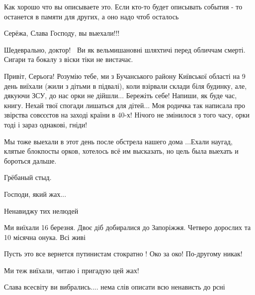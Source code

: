 
Как хорошо что вы описываете это. Если кто-то будет описывать события - то
останется в памяти для других, а оно надо чтоб осталось


Серёжа, Слава Господу, вы выехали!!!


Шедеврально, доктор!🤩🤗 Ви як вельмишановні шляхтичі перед обличчам смерті.
Сигари та бокалу з віски тіки не вистачає.


Привіт, Серьога! Розумію тебе, ми з Бучанського району Київської області на 9
день виїхали (жили з дітьми в підвалі), коли взірвали склади біля будинку, але,
дякуючи ЗСУ, до нас орки не дійшли... Бережіть себе! Напиши, як буде час, книгу.
Нехай твої спогади лишаться для дітей... Моя родичка так написала про звірства
совєєєтов на заході країни в 40-х! Нічого не змінилося з того часу, орки тоді і
зараз однакові, гніди!


Мы тоже выехали в этот день после обстрела нашего дома ...Ехали наугад, клятые
блокпосты орков, хотелось всё им высказать, но цель была выехать и бороться
дальше.

Грёбаный стыд.


Господи, який жах...

Ненавиджу тих нелюдей


Ми виїхали 16 березня. Двоє діб добиралися до Запоріжжя. Четверо дорослих та 10
місячна онука. Всі живі 🙏🙏🙏


Пусть это все вернется путинистам стократно ! Око за око! По-другому никак!


Ми теж виїхали, читаю і пригадую цей жах!


Слава всесвіту ви вибрались.... нема слів описати всю ненависть до рсні
